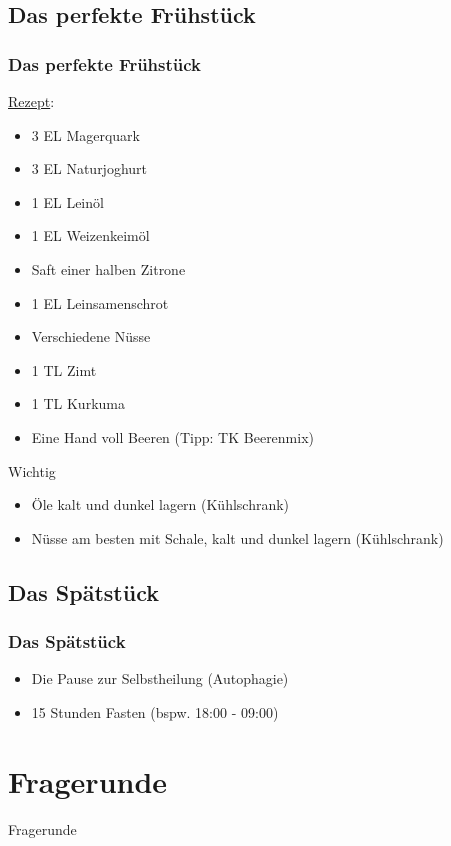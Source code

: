 \documentclass[xcolor=dvipsnames]{beamer}
\begin{document}
    \subsection{Das perfekte Frühstück}
    \begin{frame}[allowframebreaks]
        \frametitle{Das perfekte Frühstück}
        \underline{Rezept}:
        \begin{itemize}
            \setlength\itemsep{0.6em}
            \item 3 EL Magerquark
            \item 3 EL Naturjoghurt
            \item 1 EL Leinöl
            \item 1 EL Weizenkeimöl
            \item Saft einer halben Zitrone
            \item 1 EL Leinsamenschrot
            \item Verschiedene Nüsse
            \item 1 TL Zimt
            \item 1 TL Kurkuma
            \item Eine Hand voll Beeren (Tipp: TK Beerenmix)
        \end{itemize}

        \framebreak

        \begin{block}{Wichtig}
            \begin{itemize}
                \setlength\itemsep{1em}
                \item Öle kalt und dunkel lagern (Kühlschrank)
                \item Nüsse am besten mit Schale, kalt und dunkel lagern (Kühlschrank)
            \end{itemize}
        \end{block}

    \end{frame}

    \subsection{Das Spätstück}
    \begin{frame}
        \frametitle{Das Spätstück}
        \begin{itemize}
            \setlength\itemsep{1em}
            \item Die Pause zur Selbstheilung (Autophagie)
            \item 15 Stunden Fasten (bspw. 18:00 - 09:00)
        \end{itemize}
    \end{frame}

    \section{Fragerunde}
    {
        \begin{frame}
            \begin{center}
                \Huge Fragerunde
            \end{center}
        \end{frame}
    }
\end{document}
